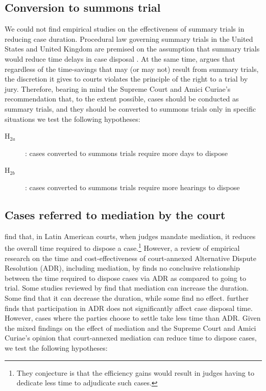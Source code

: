 \documentclass[12pt,a4paper]{article}
\begin{document}
\subsection{Conversion to summons trial}
\label{sec:conv-summ-trial}

We could not find empirical studies on the effectiveness of summary trials in reducing case duration. Procedural law governing summary trials in the United States and United Kingdom are premised on the assumption that summary trials would reduce time delays in case disposal \autocite{miller2003}. At the same time, \textcite{miller2003} argues that regardless of the time-savings that may (or may not) result from summary trials, the discretion it gives to courts violates the principle of the right to a trial by jury. Therefore, bearing in mind the Supreme Court and Amici Curiae's recommendation that, to the extent possible, cases should be conducted as summary trials, and they should be converted to summons trials only in specific situations we test the following hypotheses:

\begin{description}
\item[H$_{2a}$]: cases converted to summons trials require more days to dispose
\item[H$_{2b}$]: cases converted to summons trials require more hearings to dispose
\end{description}

\subsection{Cases referred to mediation by the court} \label{sec:furth-exam-cases}

\textcite{buscaglia1997_latinAmericaCourtDelays} find that, in Latin American courts, when judges mandate mediation, it reduces the overall time required to dispose a case.\footnote{They conjecture is that the efficiency gains would result in judges having to dedicate less time to adjudicate such cases.} However, a review of empirical research on the time and cost-effectiveness of court-annexed Alternative Dispute Resolution (ADR), including mediation, by \textcite{wissler2004effectiveness} finds no conclusive relationship between the time required to dispose cases via ADR as compared to going to trial. Some studies reviewed by \textcite{wissler2004effectiveness} find that mediation can increase the duration. Some find that it can decrease the duration, while some find no effect. \textcite{heise2010adr} further finds that participation in ADR does not significantly affect case disposal time. However, cases where the parties choose to settle take less time than ADR. Given the mixed findings on the effect of mediation and the Supreme Court and Amici Curiae's opinion that court-annexed mediation can reduce time to dispose cases, we test the following hypotheses:
\end{document}
